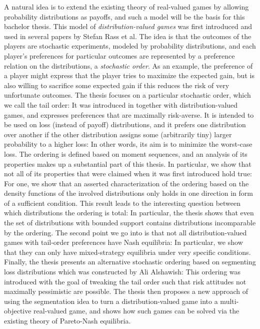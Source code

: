 \documentclass[a4paper,DIV=11,abstracton,twoside=semi]{scrreprt}
\theoremstyle{definition}
\begin{document}
    A natural idea is to extend the existing theory of real-valued games by allowing probability distributions as payoffs, and such a model will be the basis for this bachelor thesis. This model of \emph{distribution-valued games} was first introduced and used in several papers by Stefan Rass et al. The idea is that the outcomes of the players are stochastic experiments, modeled by probability distributions, and each player’s preferences for particular outcomes are represented by a preference relation on the distributions, a \emph{stochastic order}. As an example, the preference of a player might express that the player tries to maximize the expected gain, but is also willing to sacrifice some expected gain if this reduces the risk of very unfortunate outcomes.
    The thesis focuses on a particular stochastic order, which we call the tail order: It was introduced in \cite{bib:rassGameRiskManagI} together with distribution-valued games, and expresses preferences that are maximally risk-averse. It is intended to be used on loss (instead of payoff) distributions, and it prefers one distribution over another if the other distribution assigns some (arbitrarily tiny) larger probability to a higher loss: In other words, its aim is to minimize the worst-case loss. 
    The ordering is defined based on moment sequences, and an analysis of its properties makes up a substantial part of this thesis. In particular, we show that not all of its properties that were claimed when it was first introduced hold true: For one, we show that an asserted characterization of the ordering based on the density functions of the involved distributions only holds in one direction in form of a sufficient condition. This result leads to the interesting question between which distributions the ordering is total: In particular, the thesis shows that even the set of distributions with bounded support contains distributions incomparable by the ordering. The second point we go into is that not all distribution-valued games with tail-order preferences have Nash equilibria: In particular, we show that they can only have mixed-strategy equilibria under very specific conditions.
    Finally, the thesis presents an alternative stochastic ordering based on segmenting loss distributions which was constructed by Ali Alshawish: This ordering was introduced with the goal of tweaking the tail order such that risk attitudes not maximally pessimistic are possible. The thesis then proposes a new approach of using the segmentation idea to turn a distribution-valued game into a multi-objective real-valued game, and shows how such games can be solved via the existing theory of Pareto-Nash equilibria.
    
\end{document}
